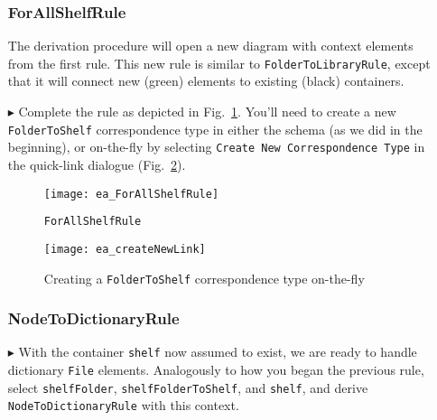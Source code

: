 \begin{itemize}
\newpage

\subsubsection{ForAllShelfRule} %

The derivation procedure will open a new diagram with context elements from the first rule. This new rule is similar to
\texttt{Fold\-er\-To\-Lib\-rar\-y\-Rule}, except that it will connect new (green) elements to existing (black) containers. 

\item[$\blacktriangleright$] Complete the rule as depicted in Fig.~\ref{ea:ForAllShelves_Complete}. You'll need to create a new \texttt{FolderToShelf}
correspondence type in either the schema (as we did in the beginning), or on-the-fly by selecting \texttt{Create New Correspondence Type} in the quick-link
dialogue (Fig.~\ref{ea:corrOnTheFly}).

\begin{figure}[htbp]
\begin{center}
  \texttt{[image: ea\_ForAllShelfRule]}
  \caption{\texttt{ForAllShelfRule}}
  \label{ea:ForAllShelves_Complete}
\end{center}
\end{figure}

\begin{figure}[htbp]
\begin{center}
  \texttt{[image: ea\_createNewLink]}
  \caption{Creating a \texttt{FolderToShelf} correspondence type on-the-fly}
  \label{ea:corrOnTheFly}
\end{center}
\end{figure}

\subsubsection{NodeToDictionaryRule} %

\item[$\blacktriangleright$] With the container \texttt{shelf} now assumed to exist, we are ready to handle dictionary \texttt{File} elements.
Analogously to how you began the previous rule, select \texttt{shelfFolder}, \texttt{shelfFolderToShelf}, and \texttt{shelf}, and derive
\texttt{NodeToDictionaryRule} with this context.

\vspace{0.5cm}


\end{itemize}
